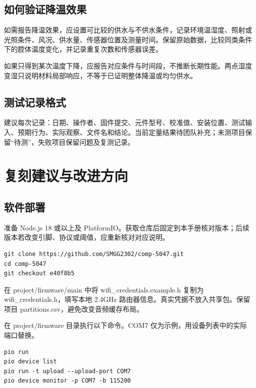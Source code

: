 \documentclass[10pt,a4paper]{article}
\begin{document}
\subsection{如何验证降温效果}

如需报告降温效果，应设置可比较的供水与不供水条件，记录环境温湿度、照射或光照条件、风况、供水量、传感器位置及测量时间。保留原始数据，比较同类条件下的腔体温度变化，并记录重复次数和传感器误差。


如果只得到某次温度下降，应报告对应条件与时间段，不推断长期性能。两点湿度变湿只说明材料局部响应，不等于已证明整体降温或均匀供水。


\subsection{测试记录格式}

建议每次记录：日期、操作者、固件提交、元件型号、校准值、安装位置、测试输入、预期行为、实际观察、文件名和结论。当前定量结果待团队补充；未测项目保留“待测”，失败项目保留问题及复测记录。


\clearpage
\section{复刻建议与改进方向}

\subsection{软件部署}

准备 Node.js 18 或以上及 PlatformIO。获取仓库后固定到本手册核对版本；后续版本若改变引脚、协议或阈值，应重新核对对应说明。


\begingroup\small\begin{verbatim}
git clone https://github.com/SMGG2302/comp-5047.git
cd comp-5047
git checkout e40f8b5
\end{verbatim}\endgroup

在 project/firmware/main 中将 wifi\_credentials.example.h 复制为 wifi\_credentials.h，填写本地 2.4GHz 路由器信息。真实凭据不放入共享包。保留项目 partitions.csv，避免改变音频缓存布局。


在 project/firmware 目录执行以下命令。COM7 仅为示例，用设备列表中的实际端口替换。


\begingroup\small\begin{verbatim}
pio run
pio device list
pio run -t upload --upload-port COM7
pio device monitor -p COM7 -b 115200
\end{verbatim}\endgroup
\end{document}
